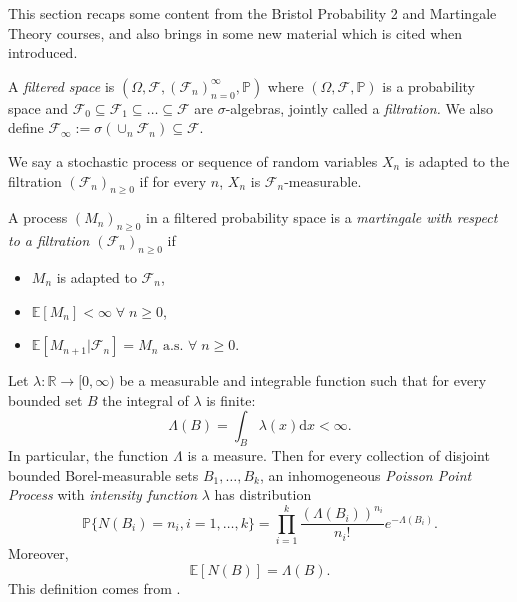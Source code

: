 This section recaps some content from the Bristol Probability 2 and Martingale Theory
courses, and also brings in some new material which is cited when introduced.

\begin{definition}
    A \emph{filtered space} is $(\Omega,\mathcal{F},(\mathcal{F}_n)_{n=0}^\infty,\mathbb{P})$
    where $(\Omega,\mathcal{F},\mathbb{P})$ is a probability space and 
    $\mathcal{F}_0\subseteq\mathcal{F}_1\subseteq\dots\subseteq\mathcal{F}$
    are $\sigma$-algebras, jointly called a \emph{filtration.} We also define
    $\mathcal{F}_\infty:=\sigma(\cup_n\mathcal{F}_n)\subseteq\mathcal{F}.$ 
    
    We say a stochastic process or sequence of random variables $X_n$ is adapted to
    the filtration $(\mathcal{F}_n)_{n\geq0}$ if for every $n$, $X_n$ is 
    $\mathcal{F}_n$-measurable. 
\end{definition}

\begin{definition}[Martingales]
    A process $(M_n)_{n\geq0}$ in a filtered probability space is a
    \emph{martingale with respect to a filtration $(\mathcal{F}_n)_{n\geq0}$}
    if
    \begin{itemize}
        \item $M_n$ is adapted to $\mathcal{F}_n$,
        \item $\mathbb{E}[M_n]<\infty\;\forall\;n\geq0$,
        \item $\mathbb{E}[M_{n+1}|\mathcal{F}_n]=M_n\textrm{ a.s. }\forall\;n\geq0.$
    \end{itemize}
\end{definition}

\begin{definition}
    Let $\lambda:\mathbb{R}\rightarrow[0,\infty)$ be a measurable and
    integrable function such that for every bounded set $B$ the integral of 
    $\lambda$ is finite:
    \begin{equation}
        \Lambda(B)=\int_B\lambda(x)\mathrm dx<\infty.
    \end{equation}
    In particular, the function $\Lambda$ is a measure.
    Then for every collection of disjoint bounded Borel-measurable sets
    $B_1,\dots,B_k$, an inhomogeneous \emph{Poisson Point Process} with
    \emph{intensity function} $\lambda$ has distribution
    \begin{equation}
        \mathbb{P}\{N(B_i)=n_i,i=1,\dots,k\}=\prod_{i=1}^k\frac{(\Lambda(B_i))^{n_i}}{n_i!}e^{-\Lambda(B_i)}.
    \end{equation}
    Moreover,
    \begin{equation}
        \mathbb{E}[N(B)]=\Lambda(B).
    \end{equation}
    This definition comes from \textcite{PointTheory}.
\end{definition}

